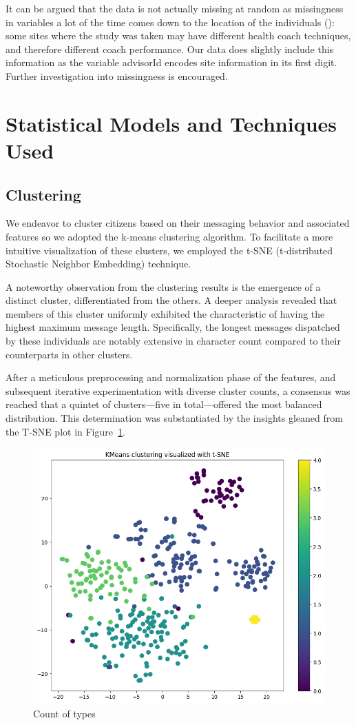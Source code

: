 \documentclass[12pt]{article}
\begin{document}
	It can be argued that the data is not actually missing at random as missingness in variables a lot of the time comes down to the location of the individuals (\cite{kangh1}): some sites where the study was taken may have different health coach techniques, and therefore different coach performance. Our data does slightly include this information as the variable \textsf{advisorId} encodes site information in its first digit. Further investigation into missingness is encouraged.

\section{Statistical Models and Techniques Used}

\label{s.stats}

\subsection{Clustering}

We endeavor to cluster citizens based on their messaging behavior and associated features so we adopted the k-means clustering algorithm. To facilitate a more intuitive visualization of these clusters, we employed the t-SNE (t-distributed Stochastic Neighbor Embedding) technique. 

A noteworthy observation from the clustering results is the emergence of a distinct cluster, differentiated from the others. A deeper analysis revealed that members of this cluster uniformly exhibited the characteristic of having the highest maximum message length. Specifically, the longest messages dispatched by these individuals are notably extensive in character count compared to their counterparts in other clusters.

After a meticulous preprocessing and normalization phase of the features, and subsequent iterative experimentation with diverse cluster counts, a consensus was reached that a quintet of clusters—five in total—offered the most balanced distribution. This determination was substantiated by the insights gleaned 
from the T-SNE plot in Figure~\ref{fig:cluster}.

\begin{figure}[h]
  \centering
  \includegraphics[width=0.6\linewidth]{images/Kmeans_5_clusters}
  \caption{Count of types}
  \label{fig:cluster}
  \end{figure}
\end{document}
